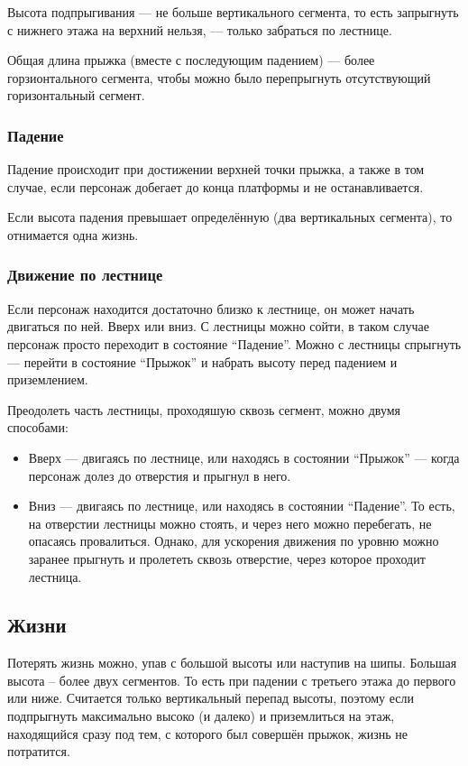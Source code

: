 \documentclass[12pt,a4paper]{article}
\begin{document}
Высота подпрыгивания --- не больше вертикального сегмента, то есть запрыгнуть с нижнего этажа на верхний нельзя, --- только забраться по лестнице.

Общая длина прыжка (вместе с последующим падением) --- более горзионтального сегмента, чтобы можно было перепрыгнуть отсутствующий горизонтальный сегмент.
\subsubsection{Падение}
Падение происходит при достижении верхней точки прыжка, а также в том случае, если персонаж добегает до конца платформы и не останавливается.

Если высота падения превышает определённую (два вертикальных сегмента), то отнимается одна жизнь.
\subsubsection{Движение по лестнице}
Если персонаж находится достаточно близко к лестнице, он может начать двигаться по ней. Вверх или вниз. С лестницы можно сойти, в таком случае персонаж просто переходит в состояние ``Падение''. Можно с лестницы спрыгнуть --- перейти в состояние ``Прыжок'' и набрать высоту перед падением и приземлением.

Преодолеть часть лестницы, проходяшую сквозь сегмент, можно двумя способами:
\begin{itemize}
\item Вверх --- двигаясь по лестнице, или находясь в состоянии ``Прыжок'' --- когда персонаж долез до отверстия и прыгнул в него.
\item Вниз --- двигаясь по лестнице, или находясь в состоянии ``Падение''. То есть, на отверстии лестницы можно стоять, и через него можно перебегать, не опасаясь провалиться. Однако, для ускорения движения по уровню можно заранее прыгнуть и пролететь сквозь отверстие, через которое проходит лестница.
\end{itemize}
\subsection{Жизни}
Потерять жизнь можно, упав с большой высоты или наступив на шипы. Большая высота -- более двух сегментов. То есть при падении с третьего этажа до первого или ниже. Считается только вертикальный перепад высоты, поэтому если подпрыгнуть максимально высоко (и далеко) и приземлиться на этаж, находящийся сразу под тем, с которого был совершён прыжок, жизнь не потратится.
\end{document}
